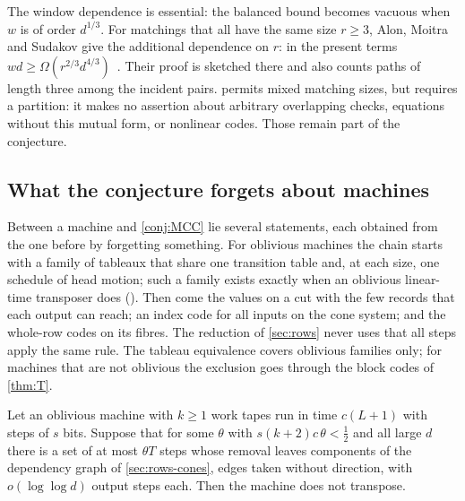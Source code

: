 The window dependence is essential: the balanced bound becomes vacuous when $w$ is of order $d^{1/3}$.
For matchings that all have the same size $r\ge3$, Alon, Moitra and Sudakov give the additional dependence on $r$:
in the present terms $wd\ge\Omega(r^{2/3}d^{4/3})$~\cite[Theorem~3.9]{AMS2013}.
Their proof is sketched there and also counts paths of length three among the incident pairs.
 permits mixed matching sizes, but requires a partition: it makes no assertion about
arbitrary overlapping checks, equations without this mutual form, or nonlinear codes. Those remain part of the conjecture.

\subsection{What the conjecture forgets about machines}\label{sec:constr-forgets}

Between a machine and \cref{conj:MCC} lie several statements, each obtained from the one before by forgetting
something. For oblivious machines the chain starts with a family of tableaux that share one transition table and,
at each size, one schedule of head motion; such a family exists exactly when an oblivious linear-time transposer
does (). Then come the values on a cut with the few records that each output
can reach; an index code for all inputs on the cone system; and the whole-row codes on its fibres. The reduction of
\cref{sec:rows} never uses that all steps apply the same rule. The tableau equivalence covers oblivious families
only; for machines that are not oblivious the exclusion goes through the block codes of \cref{thm:T}.

\begin{proposition}\label{prop:hyperfinite}
\notformalized
Let an oblivious machine with $k\ge1$ work tapes run in time $c(L+1)$ with steps of $s$ bits. Suppose that for some
$\theta$ with $s(k+2)c\,\theta<\tfrac12$ and all large $d$ there is a set of at most $\theta T$ steps whose removal
leaves components of the dependency graph of \cref{sec:rows-cones}, edges taken without direction, with
$o(\log\log d)$ output steps each.
Then the machine does not transpose.
\end{proposition}


